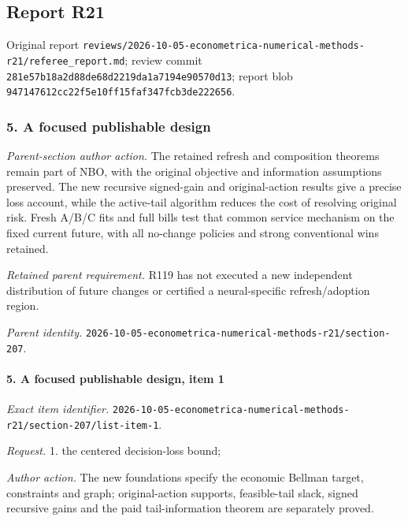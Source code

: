 \subsection{Report R21}

Original report \nolinkurl{reviews/2026-10-05-econometrica-numerical-methods-r21/referee_report.md}; review commit \nolinkurl{281e57b18a2d88de68d2219da1a7194e90570d13}; report blob \nolinkurl{947147612cc22f5e10ff15faf347fcb3de222656}.

\subsubsection{5. A focused publishable design}

\emph{Parent-section author action.} The retained refresh and composition theorems remain part of NBO, with the original objective and information assumptions preserved. The new recursive signed-gain and original-action results give a precise loss account, while the active-tail algorithm reduces the cost of resolving original risk. Fresh A/\allowbreak{}B/\allowbreak{}C fits and full bills test that common service mechanism on the fixed current future, with all no-change policies and strong conventional wins retained.

\par\emph{Retained parent requirement.} R119 has not executed a new independent distribution of future changes or certified a neural-specific refresh/\allowbreak{}adoption region.

\par\emph{Parent identity.} \nolinkurl{2026-10-05-econometrica-numerical-methods-r21/section-207}.

\paragraph{5. A focused publishable design, item 1}

\emph{Exact item identifier.} \nolinkurl{2026-10-05-econometrica-numerical-methods-r21/section-207/list-item-1}.

\par\emph{Request.} 1. the centered decision-loss bound;

\par\emph{Author action.} The new foundations specify the economic Bellman target, constraints and graph; original-action supports, feasible-tail slack, signed recursive gains and the paid tail-information theorem are separately proved.

